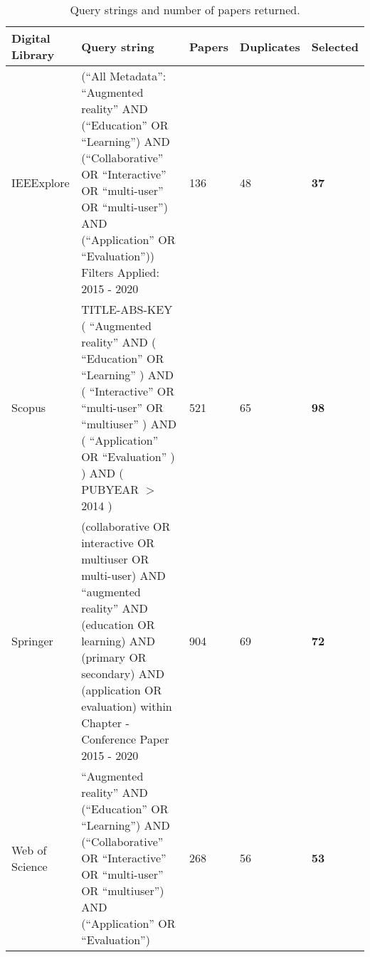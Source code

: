 \begin{landscape}


\begin{table*}[p]
\small
\caption {Query strings and number of papers returned.}\label{tab:searchstring}
\begin{tabular}{M{1.9cm}M{8cm}M{1.25cm}M{1.85cm}M{1.45cm}}
    \toprule
         \textbf{Digital Library} & \textbf{Query string} & \textbf{Papers} & \textbf{Duplicates} & \textbf{Selected} \\
    \midrule
         IEEExplore    &  (``All Metadata'': ``Augmented reality'' AND (``Education'' OR ``Learning'') AND (``Collaborative'' OR ``Interactive'' OR ``multi-user'' OR ``multi-user'') AND (``Application'' OR ``Evaluation'')) Filters Applied: 2015 - 2020 & 136 & 48 & \textbf{37} \\
    
        Scopus         & TITLE-ABS-KEY ( ``Augmented reality''  AND  ( ``Education''  OR  ``Learning'' )  AND  ( ``Interactive''  OR  ``multi-user''  OR  ``multiuser'' )  AND  ( ``Application''  OR  ``Evaluation'' ) )  AND  ( PUBYEAR $>$ 2014 )  & 521 & 65 & \textbf{98} \\
    
        Springer       & (collaborative OR interactive OR multiuser OR multi-user) AND ``augmented reality'' AND (education OR learning) AND (primary OR secondary) AND (application OR evaluation)
        within Chapter - Conference Paper  2015 - 2020  & 904 & 69 & \textbf{72} \\
    
        Web of Science & ``Augmented reality'' AND (``Education'' OR ``Learning'') AND (``Collaborative'' OR ``Interactive'' OR ``multi-user'' OR ``multiuser'') AND (``Application'' OR ``Evaluation'') & 268 & 56 & \textbf{53} \\
    \bottomrule
\end{tabular}
\end{table*}


\end{landscape}
